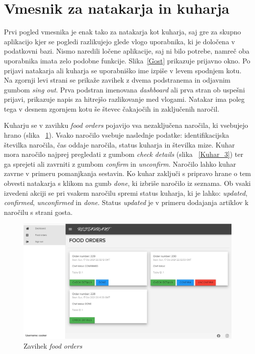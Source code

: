 \documentclass[a4paper, 12pt]{book}
\begin{document}
\section{Vmesnik za natakarja in kuharja}
Prvi pogled vmesnika je enak tako za natakarja kot kuharja, saj gre za skupno aplikacijo kjer se pogledi razlikujejo glede vlogo uporabnika, ki je določena v podatkovni bazi. Nismo naredili ločene aplikacije, saj ni bilo potrebe, namreč oba uporabnika imata zelo podobne funkcije. Slika~\ref{Gost} prikazuje prijavno okno. Po prijavi natakarja ali kuharja se uporabniško ime izpiše v levem spodnjem kotu. Na zgornji levi strani se prikaže zavihek z dvema podstranema in odjavnim gumbom \textit{sing out}. Prva podstran imenovana \textit{dashboard} ali prva stran ob uspešni prijavi, prikazuje napis za hitrejšo razlikovanje med vlogami. Natakar ima poleg tega v desnem zgornjem kotu še števec čakajočih in zaključenih naročil.

Kuharju se v zavihku \textit{food orders} pojavijo vsa nezaključena naročila, ki vsebujejo hrano (slika ~\ref{Kuhar_4}). Vsako naročilo vsebuje naslednje podatke: identifikacijska številka naročila, čas oddaje naročila, status kuharja in številka mize. Kuhar mora naročilo najprej pregledati z gumbom \textit{check details} (slika  ~\ref{Kuhar_3}) ter ga sprejeti ali zavrniti z gumbom \textit{confirm} in \textit{unconfirm}. Naročilo lahko kuhar zavrne v primeru pomanjkanja sestavin. Ko kuhar zaključi s pripravo hrane o tem obvesti natakarja s klikom na gumb \textit{done}, ki izbriše naročilo iz seznama. Ob vsaki izvedeni akciji se pri vsakem naročilu spremi status kuharja, ki je lahko: \textit{updated}, \textit{confirmed}, \textit{unconfirmed} in \textit{done}. Status \textit{updated} je v primeru dodajanja artiklov k naročilu s strani gosta.

\begin{figure}[!htb]
\begin{center}
\includegraphics[width=13cm]{cooker_1.jpg}
\caption{Zavihek \textit{food orders}}
\label{Kuhar_4}
\end{center}
\end{figure}
\end{document}
